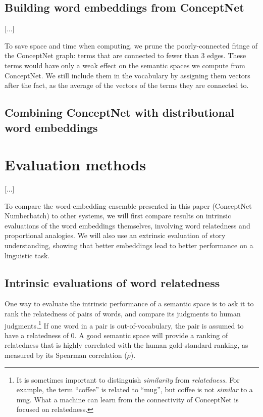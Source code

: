 \documentclass[letterpaper]{article}
\begin{document}
\subsection{Building word embeddings from ConceptNet}
\label{pruning}
[...] %

To save space and time when computing, we prune the poorly-connected fringe of
the ConceptNet graph: terms that are connected to fewer than 3 edges. These
terms would have only a weak effect on the semantic spaces we compute from
ConceptNet. We still include them in the vocabulary by assigning them vectors
after the fact, as the average of the vectors of the terms they are connected
to.

\subsection{Combining ConceptNet with distributional word embeddings}

\section{Evaluation methods}

[...]

To compare the word-embedding ensemble presented in this paper (ConceptNet
Numberbatch) to other systems, we will first compare results on intrinsic
evaluations of the word embeddings themselves, involving word relatedness and
proportional analogies. We will also use an extrinsic evaluation of story
understanding, showing that better embeddings lead to better performance on a
linguistic task.

\subsection{Intrinsic evaluations of word relatedness}
\label{intrinsic-evaluations}

One way to evaluate the intrinsic performance of a semantic space is to ask it
to rank the relatedness of pairs of words, and compare its judgments to human
judgments.\footnote{It is sometimes important to distinguish \emph{similarity}
from \emph{relatedness}. For example, the term ``coffee'' is related to
``mug'', but coffee is not \emph{similar} to a mug. What a machine can learn
from the connectivity of ConceptNet is focused on relatedness.} If one word in
a pair is out-of-vocabulary, the pair is assumed to have a relatedness of 0. A
good semantic space will provide a ranking of relatedness that is highly
correlated with the human gold-standard ranking, as measured by its Spearman
correlation ($\rho$).
\end{document}
